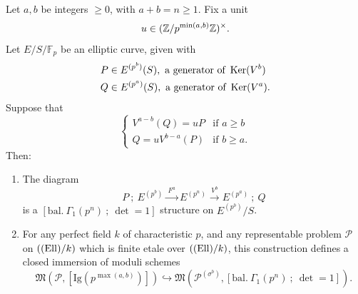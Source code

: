 \begin{kthm}\label{thm:13.11.3}
Let $a,b$ be integers $\ge 0$, with $a+b = n \ge 1$. Fix a unit
\[
u \in (\mathbb{Z}/p^{\min(a,b)}\mathbb{Z})^\times .
\]
Let $E/S/\mathbb{F}_p$ be an elliptic curve, given with
\[
\begin{aligned}
P &\in E^{(p^b)}(S) , \text{ a generator of } \operatorname{Ker}(V^b) \\
Q &\in E^{(p^a)}(S) , \text{ a generator of } \operatorname{Ker}(V^a) .
\end{aligned}
\]
Suppose that
\[
\begin{cases}
V^{a-b}(Q) = u P & \text{if } a \ge b \\
Q = u V^{b-a}(P) & \text{if } b \ge a .
\end{cases}
\]
Then:
\begin{enumerate}[(1)]
\item The diagram
\[
P\ ;\ E^{(p^b)} \xrightarrow{\ F^a\ } E^{(p^n)} \xrightarrow{\ V^b\ } E^{(p^a)}\ ;\ Q
\]
is a $[\mathrm{bal.\ }\Gamma_1(p^n)\ ;\ \det = 1]$ structure on $E^{(p^b)}/S$.
\item For any perfect field $k$ of characteristic $p$, and any representable problem $\mathcal{P}$ on $((\mathrm{Ell})/k)$ which is finite etale over $((\mathrm{Ell})/k)$, this construction defines a closed immersion of moduli schemes
\[
\mathfrak{M}(\mathcal{P}, [\mathrm{Ig}(p^{\max(a,b)})]) \hookrightarrow \mathfrak{M}(\mathcal{P}^{(\sigma^b)}, [\mathrm{bal.\ }\Gamma_1(p^n)\ ;\ \det = 1]) .
\]
\end{enumerate}
\end{kthm}

